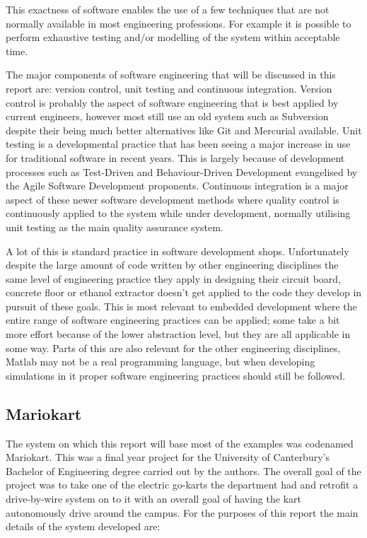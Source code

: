     This exactness of software enables the use of a few techniques that are not
    normally available in most engineering professions.  For example it is
    possible to perform exhaustive testing and/or modelling of the system within
    acceptable time.

    The major components of software engineering that will be discussed in this
    report are: version control, unit testing and continuous integration.
    Version control is probably the aspect of software engineering that is best
    applied by current engineers, however most still use an old system such as
    Subversion despite their being much better alternatives like Git and
    Mercurial available.  Unit testing is a developmental practice that has been
    seeing a major increase in use for traditional software in recent years.
    This is largely because of development processes such as Test-Driven and
    Behaviour-Driven Development evangelised by the Agile Software Development
    proponents.  Continuous integration is a major aspect of these newer
    software development methods where quality control is continuously applied
    to the system while under development, normally utilising unit testing as
    the main quality assurance system.

    A lot of this is standard practice in software development shops.
    Unfortunately despite the large amount of code written by other engineering
    disciplines the same level of engineering practice they apply in designing
    their circuit board, concrete floor or ethanol extractor doesn't get applied
    to the code they develop in pursuit of these goals.  This is most relevant
    to embedded development where the entire range of software engineering
    practices can be applied; some take a bit more effort because of the lower
    abstraction level, but they are all applicable in some way.  Parts of this
    are also relevant for the other engineering disciplines, Matlab may not be a
    real programming language, but when developing simulations in it proper
    software engineering practices should still be followed.

  \subsection{Mariokart}

    The system on which this report will base most of the examples was codenamed
    Mariokart.  This was a final year project for the University of Canterbury's
    Bachelor of Engineering degree carried out by the authors.  The overall goal
    of the project was to take one of the electric go-karts the department had
    and retrofit a drive-by-wire system on to it with an overall goal of having
    the kart autonomously drive around the campus.  For the purposes of this
    report the main details of the system developed are:

